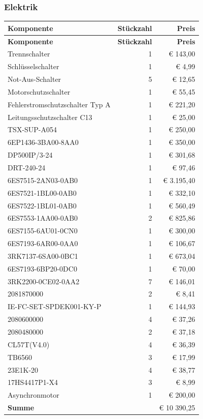 \newpage
\subsubsection{Elektrik}
\begin{longtable}{|p{7cm}|r|r|}
    \hline
    \textbf{Komponente} & \textbf{Stückzahl} & \textbf{Preis} \\
    \hline
    \endfirsthead

    \hline
    \textbf{Komponente} & \textbf{Stückzahl} & \textbf{Preis} \\
    \hline
    \endhead

    \hline
    \endfoot

    \hline
    \endlastfoot
    Trennschalter & 1 & € 143,00 \\
    Schlüsselschalter & 1 & € 4,99 \\
    Not-Aus-Schalter & 5 & € 12,65 \\
    Motorschutzschalter & 1 & € 55,45 \\
    Fehlerstromschutzschalter Typ A & 1 & € 221,20 \\
    Leitungsschutzschalter C13 & 1 & € 25,00 \\
    TSX-SUP-A054 & 1 & € 250,00 \\
    6EP1436-3BA00-8AA0 & 1 & € 350,00 \\
    DP500IP/3-24 & 1 & € 301,68 \\
    DRT-240-24 & 1 & € 97,46 \\
    6ES7515-2AN03-0AB0 & 1 & € 3.195,40 \\
    6ES7521-1BL00-0AB0 & 1 & € 332,10 \\
    6ES7522-1BL01-0AB0 & 1 & € 560,49 \\
    6ES7553-1AA00-0AB0 & 2 & € 825,86 \\
    6ES7155-6AU01-0CN0 & 1 & € 300,00 \\
    6ES7193-6AR00-0AA0 & 1 & € 106,67 \\
    3RK7137-6SA00-0BC1 & 1 & € 673,04 \\
    6ES7193-6BP20-0DC0 & 1 & € 70,00 \\
    3RK2200-0CE02-0AA2 & 7 & € 146,01 \\
    2081870000 & 2 & € 8,41 \\
    IE-FC-SET-SPDEK001-KY-P & 1 & € 144,93 \\
    2080600000 & 4 & € 37,26 \\
    2080480000 & 2 & € 37,18 \\
    CL57T(V4.0) & 4 & € 36,39 \\
    TB6560 & 3 & € 17,99 \\
    23E1K-20 & 4 & € 38,77 \\
    17HS4417P1-X4 & 3 & € 8,99 \\
    Asynchronmotor & 1 & € 200,00 \\
    \hline
    \hline
    \textbf{Summe} & & € 10 390,25 \\
\end{longtable}
\newpage
